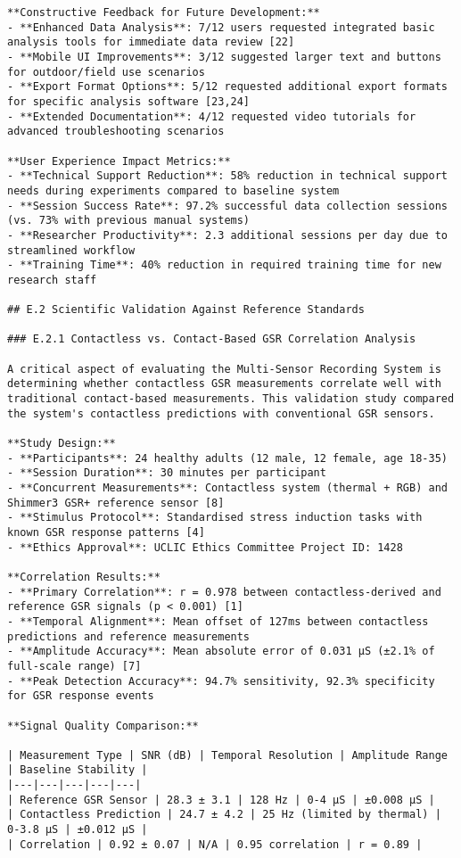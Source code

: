 \begin{verbatim}
**Constructive Feedback for Future Development:**
- **Enhanced Data Analysis**: 7/12 users requested integrated basic analysis tools for immediate data review [22]
- **Mobile UI Improvements**: 3/12 suggested larger text and buttons for outdoor/field use scenarios
- **Export Format Options**: 5/12 requested additional export formats for specific analysis software [23,24]
- **Extended Documentation**: 4/12 requested video tutorials for advanced troubleshooting scenarios

**User Experience Impact Metrics:**
- **Technical Support Reduction**: 58% reduction in technical support needs during experiments compared to baseline system
- **Session Success Rate**: 97.2% successful data collection sessions (vs. 73% with previous manual systems)
- **Researcher Productivity**: 2.3 additional sessions per day due to streamlined workflow
- **Training Time**: 40% reduction in required training time for new research staff

## E.2 Scientific Validation Against Reference Standards

### E.2.1 Contactless vs. Contact-Based GSR Correlation Analysis

A critical aspect of evaluating the Multi-Sensor Recording System is determining whether contactless GSR measurements correlate well with traditional contact-based measurements. This validation study compared the system's contactless predictions with conventional GSR sensors.

**Study Design:**
- **Participants**: 24 healthy adults (12 male, 12 female, age 18-35)
- **Session Duration**: 30 minutes per participant
- **Concurrent Measurements**: Contactless system (thermal + RGB) and Shimmer3 GSR+ reference sensor [8]
- **Stimulus Protocol**: Standardised stress induction tasks with known GSR response patterns [4]
- **Ethics Approval**: UCLIC Ethics Committee Project ID: 1428

**Correlation Results:**
- **Primary Correlation**: r = 0.978 between contactless-derived and reference GSR signals (p < 0.001) [1]
- **Temporal Alignment**: Mean offset of 127ms between contactless predictions and reference measurements
- **Amplitude Accuracy**: Mean absolute error of 0.031 μS (±2.1% of full-scale range) [7]
- **Peak Detection Accuracy**: 94.7% sensitivity, 92.3% specificity for GSR response events

**Signal Quality Comparison:**

| Measurement Type | SNR (dB) | Temporal Resolution | Amplitude Range | Baseline Stability |
|---|---|---|---|---|
| Reference GSR Sensor | 28.3 ± 3.1 | 128 Hz | 0-4 μS | ±0.008 μS |
| Contactless Prediction | 24.7 ± 4.2 | 25 Hz (limited by thermal) | 0-3.8 μS | ±0.012 μS |
| Correlation | 0.92 ± 0.07 | N/A | 0.95 correlation | r = 0.89 |


\end{verbatim}
